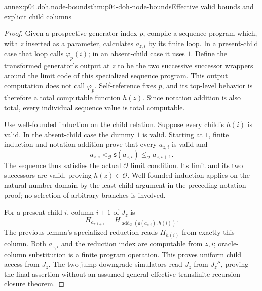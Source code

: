 \begin{annexitem}{annex:p04.doh.node-bounds}{thm:p04-doh-node-bounds}{Effective valid bounds and explicit child columns}
\begin{proof}
Given a prospective generator index \(p\), compile a sequence program
which, with \(z\) inserted as a parameter, calculates \(a_{z,i}\)
by its finite loop. In a present-child case that loop calls
\(\varphi_p(i)\); in an absent-child case it uses \(1\). Define
the transformed generator's output at \(z\) to be the two successive
successor wrappers around the limit code of this specialized sequence
program. This output computation does not call \(\varphi_p\).
Self-reference fixes \(p\), and its top-level behavior is therefore
a total computable function \(h(z)\). Since notation addition is
also total, every individual sequence value is total computable.

Use well-founded induction on the child relation. Suppose every
child's \(h(i)\) is valid. In the absent-child case the dummy \(1\)
is valid. Starting at \(1\), finite induction and notation addition
prove that every \(a_{z,i}\) is valid and
\[
 a_{z,i}<_{\mathcal O}\mathsf s(a_{z,i})
       \leq_{\mathcal O}a_{z,i+1}.
\]
The sequence thus satisfies the actual \(\mathcal O\) limit
condition. Its limit and its two successors are valid, proving
\(h(z)\in\mathcal O\). Well-founded induction applies on the
natural-number domain by the least-child argument in the preceding
notation proof; no selection of arbitrary branches is involved.

For a present child \(i\), column \(i+1\) of \(J_z\) is
\[
 H_{a_{z,i+1}}=
 H_{\operatorname{add}_{\mathcal O}(\mathsf s(a_{z,i}),h(i))}.
\]
The previous lemma's specialized reduction reads \(H_{h(i)}\)
from exactly this column. Both \(a_{z,i}\) and the reduction index
are computable from \(z,i\); oracle-column substitution is a finite
program operation. This proves uniform child access from \(J_z\).
The two jump-downgrade simulators read \(J_z\) from \(J_z''\),
proving the final assertion without an assumed general effective
transfinite-recursion closure theorem.
\end{proof}
\end{annexitem}

